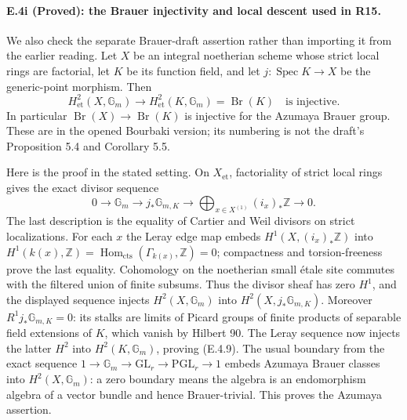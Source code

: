 \paragraph{E.4i (Proved): the Brauer injectivity and local descent used in R15.}
We also check the separate Brauer-draft assertion rather than importing
it from the earlier reading. Let $X$ be an integral noetherian scheme
whose strict local rings are factorial, let $K$ be its function field,
and let $j:\operatorname{Spec}K\to X$ be the generic-point morphism.
Then
\[
 H^2_{\mathrm{et}}(X,\mathbb G_m)
       \longrightarrow H^2_{\mathrm{et}}(K,\mathbb G_m)
       =\operatorname{Br}(K)
 \quad\text{is injective}.
 \tag{E.4.9}
\]
In particular $\operatorname{Br}(X)\to\operatorname{Br}(K)$ is
injective for the Azumaya Brauer group. These are
\citet[Corollaries 1.8 and 1.10, p.~293]{D_Grothendieck1966BrauerII}
in the opened Bourbaki version; its numbering is not the draft's
Proposition 5.4 and Corollary 5.5.

Here is the proof in the stated setting. On $X_{\mathrm{et}}$,
factoriality of strict local rings gives the exact divisor sequence
\[
 0\longrightarrow\mathbb G_m\longrightarrow j_*\mathbb G_{m,K}
   \longrightarrow
   \bigoplus_{x\in X^{(1)}}(i_x)_*\mathbb Z\longrightarrow0.
\]
The last description is the equality of Cartier and Weil divisors
on strict localizations. For each $x$ the Leray edge map embeds
$H^1(X,(i_x)_*\mathbb Z)$ into
$H^1(k(x),\mathbb Z)=
\operatorname{Hom}_{\mathrm{cts}}(\Gamma_{k(x)},\mathbb Z)=0$;
compactness and torsion-freeness prove the last equality.
Cohomology on the noetherian small \'etale site commutes with the
filtered union of finite subsums. Thus the divisor sheaf has zero
$H^1$, and the displayed sequence injects $H^2(X,\mathbb G_m)$ into
$H^2(X,j_*\mathbb G_{m,K})$.
Moreover $R^1j_*\mathbb G_{m,K}=0$: its stalks are limits of Picard
groups of finite products of separable field extensions of $K$, which
vanish by Hilbert 90. The Leray sequence now injects the latter $H^2$
into $H^2(K,\mathbb G_m)$, proving (E.4.9).
The usual boundary from the exact sequence
$1\to\mathbb G_m\to\mathrm{GL}_r\to\mathrm{PGL}_r\to1$
embeds Azumaya Brauer classes into $H^2(X,\mathbb G_m)$: a zero
boundary means the algebra is an endomorphism algebra of a vector
bundle and hence Brauer-trivial. This proves the Azumaya assertion.

